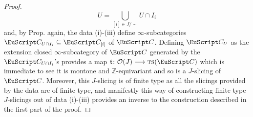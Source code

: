 {\begin{proof}
\[
U=\bigcup_{[i]\in J/\sim}U\cap I_i
\]
and, by Prop.  again, the data (i)-(iii) define $\infty$-subcategories $\C_{U\cap I_i}\subseteq \C_{[i]}$ of $\C$. Defining $\C_U$ as the extension closed $\infty$-subcategory of $\C$ generated by the $\C_{U\cap I_i}$'s provides a map $\tee\colon \O(J)\to \ts(\C)$ which is immediate to see it is montone and $\mathbb{Z}$-equivariant and so is a $J$-slicing of $\C$. Moreover, this $J$-slicing is of finite type as all the slicings provided by the data are of finite type, and manifestly this way of constructing  finite type $J$-slicings out of
data (i)-(iii) provides an inverse to the construction described in the first part of the proof.  
\end{proof}
}








